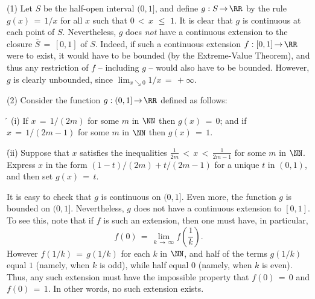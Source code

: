 \V

\hspace*{\parindent}(1) Let $S$ be the half-open interval $(0,1]$, and define $g:S \,{\rightarrow}\, {\RR}$ by the rule $g(x) \,=\, 1/x$ for all $x$ such that $0\,<\,x\,\,{\leq}\,\,1$.
    It is clear that $g$ is continuous at each point of $S$. Nevertheless, $g$ does {\em not} have a continuous extension to the closure $\overline{S} \,=\, [0,1]$ of $S$.
    Indeed, if such a continuous extension $f:[0,1] \,{\rightarrow}\, {\RR}$ were to exist,
    it would have to be bounded (by the Extreme-Value Theorem), and thus any restriction of $f$ -- including $g$ -- would also have to be bounded.
    However, $g$ is clearly unbounded, since $\lim_{x{\searrow}0} 1/x \,=\, +{\infty}$.

\V


        (2) Consider the function $g:(0,1] \,{\rightarrow}\, {\RR}$ defined as follows:

        \h\, (i) If $x \,=\, 1/(2m)$ for some $m$ in ${\NN}$ then $g(x) \,=\, 0$;
    and if $x \,=\, 1/(2m-1)$ for some $m$ in ${\NN}$ then $g(x) \,=\, 1$.

        \h (ii) Suppose that $x$ satisfies the inequalities ${\displaystyle \frac{1}{2m}\,<\,x\,<\, \frac{1}{2m-1}}$ for some $m$ in ${\NN}$.
    Express $x$ in the form $(1-t)/(2m)+t/(2m-1)$ for a unique $t$ in $(0,1)$, and then set $g(x) \,=\, t$.

\noindent It is easy to check that $g$ is continuous on $(0,1]$. Even more, the function $g$ is bounded on $(0,1]$. Nevertheless, $g$ does not have a continuous extension to $[0,1]$.
    To see this, note that if $f$ is such an extension, then one must have, in particular,
        \begin{displaymath}
        f(0) \,=\, \lim_{k \,{\rightarrow}\, {\infty}} f\left(\frac{1}{k}\right).
        \end{displaymath}
    However $f(1/k) \,=\, g(1/k)$ for each $k$ in ${\NN}$, and half of the terms $g(1/k)$ equal $1$ (namely, when $k$ is odd), while half equal $0$ (namely, when $k$ is even).
    Thus, any such extension must have the impossible property that $f(0) \,=\, 0$ and $f(0) \,=\, 1$.
    In other words, no such extension exists.

\V

